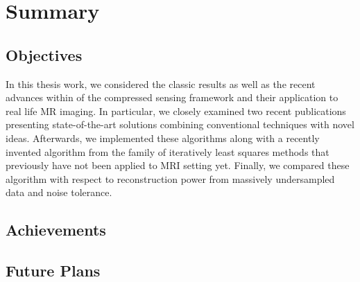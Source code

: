 \chapter{Summary}

\section{Objectives}

In this thesis work, we considered the classic results as well as the recent advances within of the compressed sensing framework and their application to real life MR imaging. In particular, we closely examined two recent publications presenting state-of-the-art solutions combining conventional techniques with novel ideas. Afterwards, we implemented these algorithms along with a recently invented algorithm from the family of iteratively least squares methods that previously have not been applied to MRI setting yet. Finally, we compared these algorithm with respect to reconstruction power from massively undersampled data and noise tolerance.

\section{Achievements}
\section{Future Plans}